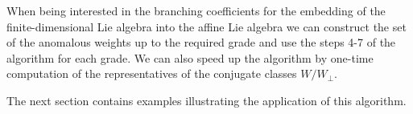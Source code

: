 \documentclass[12pt]{iopart}
\newtheorem{mynote}{Note}[section]
\theoremstyle{definition}
\newtheorem{definition}{Definition}
\begin{document}
When being interested in the branching coefficients for the embedding of the
finite-dimensional Lie algebra into the affine Lie algebra we can construct
the set of the anomalous weights up to the required grade and use the steps
4-7 of the algorithm for each grade. We can also speed up the algorithm by
one-time computation of the representatives of the conjugate classes $%
W/W_{\bot }$.

The next section contains examples illustrating the application of this
algorithm.




\end{document}
